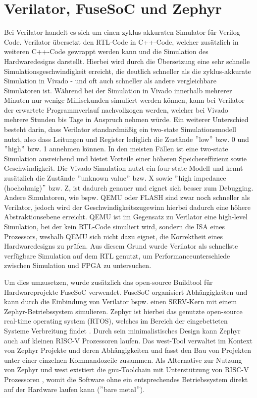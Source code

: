 \section{Verilator, FuseSoC und Zephyr}
    Bei Verilator handelt es sich um einen zyklus-akkuraten Simulator für Verilog-Code.
    Verilator übersetzt den RTL-Code in C++-Code, welcher zusätzlich in weiteren C++-Code gewrappt werden kann und die Simulation des Hardwaredesigns darstellt.
    Hierbei wird durch die Übersetzung eine sehr schnelle Simulationsgeschwindigkeit erreicht, die deutlich schneller als die zyklus-akkurate Simulation in Vivado - und oft auch schneller als andere vergleichbare Simulatoren ist.
    Während bei der Simulation in Vivado innerhalb mehrerer Minuten nur wenige Millisekunden simuliert werden können, kann bei Verilator der erwartete Programmverlauf nachvollzogen werden, welcher bei Vivado mehrere Stunden bis Tage in Anspruch nehmen würde.
    Ein weiterer Unterschied besteht darin, dass Verilator standardmäßig ein two-state Simulationsmodell nutzt, also dass Leitungen und Register lediglich die Zustände \("\)low\("\) bzw. 0 und \("\)high\("\) bzw. 1 annehmen können.
    In den meisten Fällen ist eine two-state Simulation ausreichend und bietet Vorteile einer höheren Speichereffizienz sowie Geschwindigkeit.
    Die Vivado-Simulation nutzt ein four-state Modell und kennt zusätzlich die Zustände \("\)unknown value\("\) bzw. X sowie \("\)high impedance (hochohmig)\("\) bzw. Z, ist dadurch genauer und eignet sich besser zum Debugging.
    Andere Simulatoren, wie bspw. QEMU \parencite{bellard2005qemu} oder FLASH \parencite{choi2020flash} sind zwar noch schneller als Verilator, jedoch wird der Geschwindigkeitszugewinn hierbei dadurch eine höhere Abstraktionsebene erreicht.
    QEMU ist im Gegensatz zu Verilator eine high-level Simulation, bei der kein RTL-Code simuliert wird, sondern die ISA eines Prozessors, weshalb QEMU sich nicht dazu eignet, die Korrektheit eines Hardwaredesigns zu prüfen.
    Aus diesem Grund wurde Verilator als schnellste verfügbare Simulation auf dem RTL genutzt, um Performanceunterschiede zwischen Simulation und FPGA zu untersuchen.

    Um dies umzusetzen, wurde zusätzlich das open-source Buildtool für Hardwareprojekte FuseSoC \parencite{kindgren_fusesoc} verwendet.
    FuseSoC organisiert Abhängigkeiten und kann durch die Einbindung von Verilator bspw. einen SERV-Kern mit einem Zephyr-Betriebssystem simulieren.
    Zephyr ist hierbei das genutzte open-source real-time operating system (RTOS), welches im Bereich der eingebetteten Systeme Verbreitung findet \parencite{zephyr}.
    Durch sein minimalistisches Design kann Zephyr auch auf kleinen RISC-V Prozessoren laufen.
    Das west-Tool verwaltet im Kontext von Zephyr Projekte und deren Abhängigkeiten und fasst den Bau von Projekten unter einer einzelnen Kommandozeile zusammen.
    Als Alternative zur Nutzung von Zephyr und west existiert die gnu-Toolchain mit Unterstützung von RISC-V Prozessoren \parencite{risc-buildtool}, womit die Software ohne ein entsprechendes Betriebssystem direkt auf der Hardware laufen kann (\("\)bare metal\("\)).
